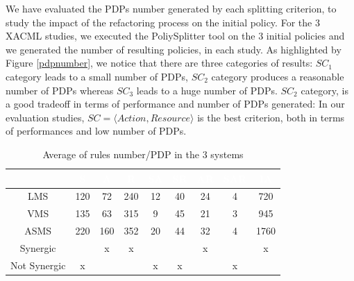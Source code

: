 {We have evaluated the PDPs number generated by each splitting criterion, to study the impact of the refactoring process on the initial policy. 
For the 3 XACML studies, we executed the PoliySplitter tool on the 3 initial policies and we generated the number of resulting policies, in each study. 
As highlighted by Figure \ref{pdpnumber}, we notice that there are three
 categories of results: $SC_{1}$ category leads to a small number of PDPs, $SC_{2}$ category produces a reasonable number of PDPs whereas $SC_{3}$ leads to a huge 
number of PDPs. $SC_{2}$ category, is a good tradeoff in terms of performance and number of 
PDPs generated: In our evaluation studies, $SC=\langle Action, Resource\rangle$ is the best criterion, both in terms of performances and low number of PDPs.


\begin{table}[h!]
\centering
\begin{tabular}{|>{\tiny}c|>{\tiny}c|>{\tiny}c|>{\tiny}c|>{\tiny}c|>{\tiny}c|>{\tiny}c|>{\tiny}c|>{\tiny}c|}   
\hline  \rowcolor{black} \scriptsize \bf \textcolor {white}{}
& \scriptsize \bf \textcolor {white}{S}
& \scriptsize \bf \textcolor {white}{A}
& \scriptsize \bf \textcolor  {white}{R}
& \scriptsize \bf \textcolor  {white}{SA}
& \scriptsize \bf \textcolor  {white}{SR}
& \scriptsize \bf \textcolor  {white}{AR} 
& \scriptsize \bf \textcolor  {white}{SAR}
& \scriptsize \bf \textcolor {white}{IA}\\ \hline


\scriptsize  {LMS}
&\scriptsize  {120}
& \scriptsize {72}
& \scriptsize {240}
& \scriptsize {12}
& \scriptsize {40}
& \scriptsize {24}
& \scriptsize {4}
& \scriptsize {720}
  \\ \hline


\scriptsize  {VMS}
&\scriptsize  {135}
& \scriptsize {63}
& \scriptsize {315}
& \scriptsize {9}
& \scriptsize {45}
& \scriptsize {21}
& \scriptsize {3}
& \scriptsize {945}
  \\ \hline
\scriptsize  {ASMS}
&\scriptsize  {220}
& \scriptsize {160}
& \scriptsize {352}
& \scriptsize {20}
& \scriptsize {44}
& \scriptsize {32}
& \scriptsize {4}
& \scriptsize {1760}
  \\ \hline
\scriptsize  {Synergic}
&\scriptsize  {}
& \scriptsize {x}
& \scriptsize {x}
& \scriptsize {}
& \scriptsize {}
& \scriptsize {x}
& \scriptsize {}
& \scriptsize {x}
  \\ \hline

\scriptsize  {Not Synergic}
&\scriptsize  {x}
& \scriptsize {}
& \scriptsize {}
& \scriptsize {x}
& \scriptsize {x}
& \scriptsize {}
& \scriptsize {x}
& \scriptsize {}
  \\ \hline
\end{tabular}
\caption{Average of rules number/PDP in the 3 systems}\end{table}

}
